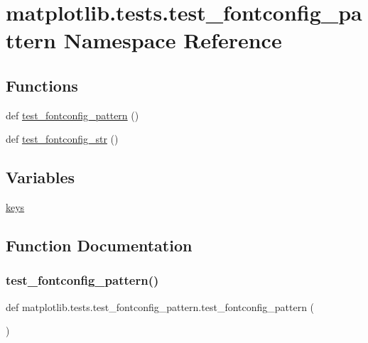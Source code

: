 \hypertarget{namespacematplotlib_1_1tests_1_1test__fontconfig__pattern}{}\section{matplotlib.\+tests.\+test\+\_\+fontconfig\+\_\+pattern Namespace Reference}
\label{namespacematplotlib_1_1tests_1_1test__fontconfig__pattern}
\subsection*{Functions}
\begin{DoxyCompactItemize}
\item 
def \hyperlink{namespacematplotlib_1_1tests_1_1test__fontconfig__pattern_a6ecb4ea58f705a10a02da45d1034a545}{test\+\_\+fontconfig\+\_\+pattern} ()
\item 
def \hyperlink{namespacematplotlib_1_1tests_1_1test__fontconfig__pattern_ad52748b7427a4c4984d53d2469b947e2}{test\+\_\+fontconfig\+\_\+str} ()
\end{DoxyCompactItemize}
\subsection*{Variables}
\begin{DoxyCompactItemize}
\item 
\hyperlink{namespacematplotlib_1_1tests_1_1test__fontconfig__pattern_a0d6d232fc435a034bcecb4e0dd022c90}{keys}
\end{DoxyCompactItemize}


\subsection{Function Documentation}
\mbox{\label{namespacematplotlib_1_1tests_1_1test__fontconfig__pattern_a6ecb4ea58f705a10a02da45d1034a545}} 
\subsubsection{\texorpdfstring{test\+\_\+fontconfig\+\_\+pattern()}{test\_fontconfig\_pattern()}}
{\footnotesize\ttfamily def matplotlib.\+tests.\+test\+\_\+fontconfig\+\_\+pattern.\+test\+\_\+fontconfig\+\_\+pattern (\begin{DoxyParamCaption}{ }\end{DoxyParamCaption})}


